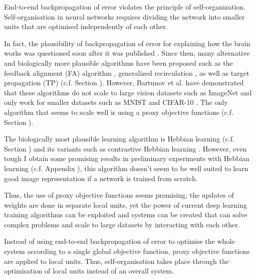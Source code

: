 \begin{claim}
	End-to-end backpropagation of error violates the principle of self-organization. Self-organisation in neural networks requires dividing the network into smaller units that are optimised independently of each other.
\end{claim}

In fact, the plausibility of backpropagation of error for explaining how the brain works was questioned soon after it was published .
Since then, many alternative and biologically more plausible algorithms have been proposed such as the feedback alignment (FA) algorithm , generalized recirculation , as well as target propagation (TP)  (c.f. Section ).
However, Bartunov et al.  have demonstrated that these algorithms do not scale to large vision datasets such as ImageNet \cite{deng2009imagenet} and only work for smaller datasets such as MNIST \cite{MNIST} and CIFAR-10 \cite{cifar_10}.
The only algorithm that seems to scale well is using a proxy objective functions (c.f. Section ).

The biologically most plausible learning algorithm is Hebbian learning (c.f. Section ) and its variants such as contrastive Hebbian learning .
However, even tough I obtain some promising results in preliminary experiments with Hebbian learning (c.f. Appendix ), this algorithm doesn't seem to be well suited to learn good image representation if a network is trained from scratch.

Thus, the use of proxy objective functions seems promising; the updates of weights are done in separate local units, yet the power of current deep learning training algorithms can be exploited and systems can be created that can solve complex problems and scale to large datasets by interacting with each other.

\begin{implementation}
	Instead of using end-to-end backpropagation of error to optimise the whole system according to a single global objective function, proxy objective functions are applied to local units. Thus, self-organisation takes place through the optimisation of local units instead of an overall system.
\end{implementation}

